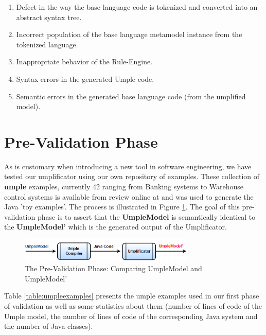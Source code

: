 \begin{enumerate}
\item Defect in the way the base language code is tokenized and converted into an abstract syntax tree.
\item Incorrect population of the base language metamodel instance from the tokenized language.
\item Inappropriate behavior of the Rule-Engine.
\item Syntax errors in the generated Umple code.
\item Semantic errors in the generated base language code (from the umplified model).
\end{enumerate}

\section{Pre-Validation Phase}

As is customary when introducing a new tool in software engineering, we have tested our umplificator using our own repository of examples. These collection of \textbf{umple} examples, currently 42 ranging from Banking systems to Warehouse control systems is available from review online at \cite{umpleexamples} and was used to generate the Java 'toy examples'. The process is illustrated in Figure \ref{fig:preValidation}. The goal of this pre-validation phase is to assert that the \textbf{UmpleModel} is semantically identical to the \textbf{UmpleModel'} which is the generated output of the Umplificator.
 
\begin{figure}[h]
\centering
\includegraphics[width=0.75\textwidth]{Figures/preValidation.png} 
\caption{The Pre-Validation Phase: Comparing UmpleModel and UmpleModel'}
\label{fig:preValidation}
\end{figure}

Table \ref{table:umpleexamples} presents the umple examples used in our first phase of validation as well as  some statistics about them (number of lines of code of the Umple model, the number of lines of code of the corresponding Java system and the number of Java classes).

